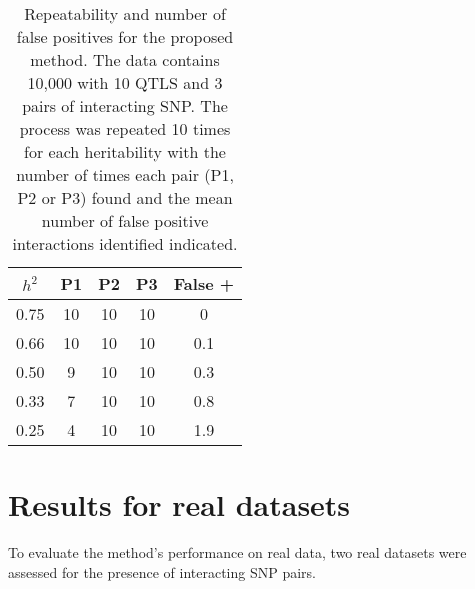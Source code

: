 \documentclass[preprint,12pt,3p]{elsarticle}
\begin{document}
\begin{table}
  \begin{center}
    \begin{tabular}{|ccccc|}
      \hline
      $h^2$ & P1 & P2 & P3   &  False + \\
      \hline                
      0.75  & 10 & 10 & 10   &  0\\
      0.66  & 10 & 10 & 10   &  0.1 \\
      0.50  & 9  & 10 & 10   &  0.3 \\
      0.33  & 7  & 10 & 10   &  0.8 \\
      0.25  & 4  & 10 & 10   &  1.9 \\
      \hline          
    \end{tabular}
  \end{center}
  \caption{Repeatability and number of false positives for the proposed method. The data contains 10,000 with 10 QTLS and 3 pairs of interacting SNP.
    The process was repeated 10 times for each heritability with the number of times each pair (P1, P2 or P3) found and the mean number of false positive
    interactions identified indicated.}
  \label{table:Repeatability_of_the_proposed_method}
\end{table}



\section{Results for real datasets}
To evaluate the method's performance on real data, two real datasets were assessed for the presence of interacting SNP
pairs.
\end{document}
